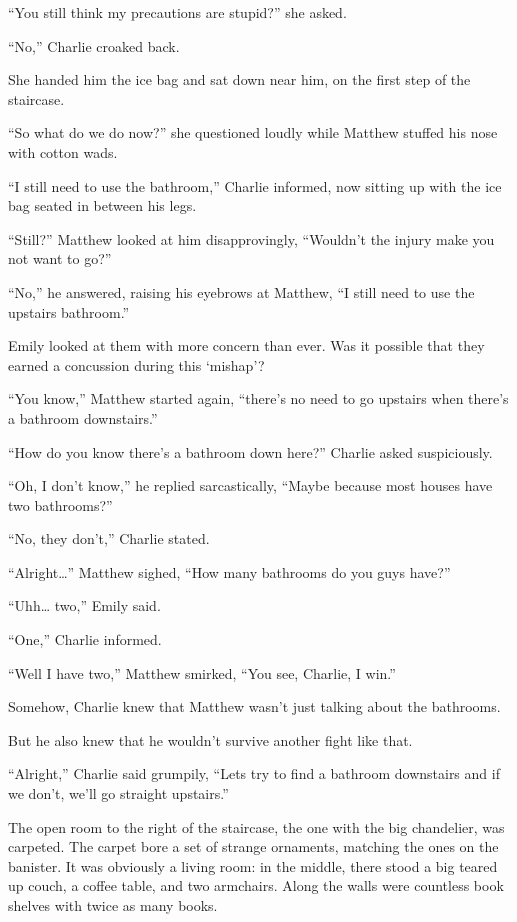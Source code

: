 “You still think my precautions are stupid?” she asked.

“No,” Charlie croaked back.

She handed him the ice bag and sat down near him, on the first step of the staircase.

“So what do we do now?” she questioned loudly while Matthew stuffed his nose with  cotton wads.

“I still need to use the bathroom,” Charlie informed, now sitting up with the ice bag seated in between his legs.

“Still?” Matthew looked at him disapprovingly, “Wouldn't the injury make you not want to go?”

“No,” he answered, raising his eyebrows at Matthew, “I still need to use the upstairs bathroom.”

Emily looked at them with more concern than ever. Was it possible that they earned a concussion during this ‘mishap'?

“You know,” Matthew started again, “there's no need to go upstairs when there's a bathroom downstairs.”

“How do you know there's a bathroom down here?” Charlie asked suspiciously.

“Oh, I don't know,” he replied sarcastically, “Maybe because most houses have two bathrooms?”

“No, they don't,” Charlie stated.

“Alright…” Matthew sighed, “How many bathrooms do you guys have?”

“Uhh… two,” Emily said.

“One,” Charlie informed.

“Well I have two,” Matthew smirked, “You see, Charlie, I win.”

Somehow, Charlie knew that Matthew wasn't just talking about the bathrooms.

But he also knew that he wouldn't survive another fight like that.

“Alright,” Charlie said grumpily, “Lets try to find a bathroom downstairs and if we don't, we'll go straight upstairs.”

\bigskip

The open room to the right of the staircase, the one with the big chandelier, was carpeted. The carpet bore a set of strange ornaments, matching the ones on the banister. It was obviously a living room: in the middle, there stood a big teared up couch, a coffee table, and two armchairs. Along the walls were countless book shelves with twice as many books.

